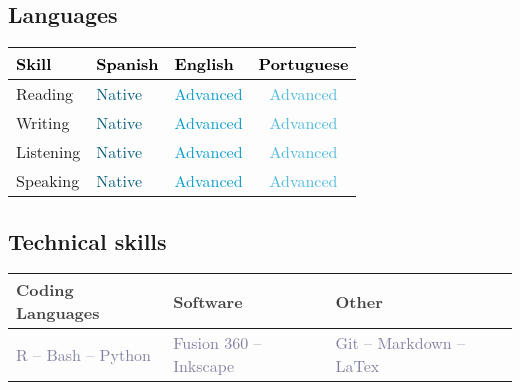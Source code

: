 \documentclass[11pt,a4paper,]{awesome-cv}
\begin{document}
\hypertarget{languages}{%
\subsection{\texorpdfstring{
Languages}{ Languages}}\label{languages}}

\begin{table}[H]
\centering\begingroup\fontsize{10}{12}\selectfont

\begin{tabular}{>{\centering\arraybackslash}p{4.75cm}>{\centering\arraybackslash}p{4.75cm}>{\centering\arraybackslash}p{4.75cm}c}
\toprule
\textcolor[HTML]{000000}{\textbf{Skill}} & \textcolor[HTML]{000000}{\textbf{Spanish}} & \textcolor[HTML]{000000}{\textbf{English}} & \textcolor[HTML]{000000}{\textbf{Portuguese}}\\
\midrule
Reading & \textcolor[HTML]{005c7b}{Native} & \textcolor[HTML]{009acd}{Advanced} & \textcolor[HTML]{4cb8dc}{Advanced}\\
Writing & \textcolor[HTML]{005c7b}{Native} & \textcolor[HTML]{009acd}{Advanced} & \textcolor[HTML]{4cb8dc}{Advanced}\\
Listening & \textcolor[HTML]{005c7b}{Native} & \textcolor[HTML]{009acd}{Advanced} & \textcolor[HTML]{4cb8dc}{Advanced}\\
Speaking & \textcolor[HTML]{005c7b}{Native} & \textcolor[HTML]{009acd}{Advanced} & \textcolor[HTML]{4cb8dc}{Advanced}\\
\bottomrule
\end{tabular}
\endgroup{}
\end{table}

\hypertarget{technical-skills}{%
\subsection{\texorpdfstring{ Technical
skills}{ Technical skills}}\label{technical-skills}}

\begin{table}[H]
\centering\begingroup\fontsize{10}{12}\selectfont

\begin{tabular}{>{\centering\arraybackslash}p{4.75cm}>{\centering\arraybackslash}p{4.75cm}>{\centering\arraybackslash}p{4.75cm}}
\toprule
\textcolor[HTML]{414141}{\textbf{Coding Languages}} & \textcolor[HTML]{414141}{\textbf{Software}} & \textcolor[HTML]{414141}{\textbf{Other}}\\
\midrule
\textcolor[HTML]{7f7f9f}{R -- Bash -- Python} & \textcolor[HTML]{7f7f9f}{Fusion 360 -- Inkscape} & \textcolor[HTML]{7f7f9f}{Git -- Markdown -- LaTex}\\
\bottomrule
\end{tabular}
\endgroup{}
\end{table}


\label{LastPage}~
\end{document}
